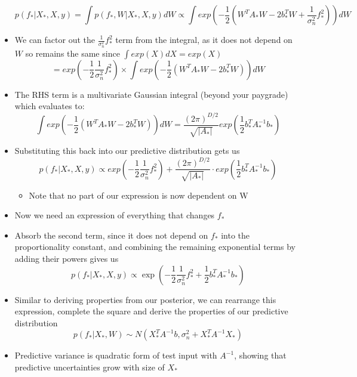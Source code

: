 \documentclass[12pt]{article}
\begin{document}
\begin{itemize}
\begin{equation}
    p(f_*|X_*,X,y) = \int p(f_*,W|X_*,X,y)dW \propto \int exp\left(-\frac{1}{2}\left(W^TA_*W - 2b_*^TW + \frac{1}{\sigma_n^2}f_*^2\right)\right)dW
\end{equation}
    \item We can factor out the $\frac{1}{\sigma_n^2}f_*^2$ term from the integral, as it does not depend on $W$ so remains the same since $\int exp(X) dX = exp(X)$ 
\begin{equation}
    = exp\left(-\frac{1}{2}\frac{1}{\sigma_n^2}f_*^2\right) \times \int exp\left(-\frac{1}{2}\left(W^TA_*W - 2b_*^TW\right)\right) dW
\end{equation}
    \item The RHS term is a multivariate Gaussian integral (beyond your paygrade) which evaluates to:
\begin{equation}
    \int exp\left(-\frac{1}{2} \left( W^TA_*W - 2b_*^TW \right) \right) dW = \frac{(2\pi)^{D/2}} {\sqrt{|A_*|}} exp\left( \frac{1}{2} b_*^TA_*^{-1}b_* \right)
\end{equation}
    \item Substituting this back into our predictive distribution gets us
\begin{equation}
    p(f_*|X_*,X,y) \propto exp\left(-\frac{1}{2}\frac{1}{\sigma_n^2}f_*^2\right) + \frac{(2\pi)^{D/2}}{\sqrt{|A_*|}} \cdot exp\left(\frac{1}{2}b_*^TA_*^{-1}b_*\right)  
\end{equation}
    \begin{itemize}
        \item Note that no part of our expression is now dependent on W
    \end{itemize}
    \item Now we need an expression of everything that changes $f_*$
    \item Absorb the second term, since it does not depend on $f_*$ into the proportionality constant, and combining the remaining exponential terms by adding their powers gives us
\begin{equation}
    p(f_*|X_*,X,y) \propto \exp\left(-\frac{1}{2}\frac{1}{\sigma_n^2}f_*^2 + \frac{1}{2}b_*^TA_*^{-1}b_*\right)
\end{equation}
    \item Similar to deriving properties from our posterior, we can rearrange this expression, complete the square and derive the properties of our predictive distribution
\begin{equation}
    p(f_*|X_*,W) \sim N(X_*^TA^{-1}b, \sigma_n^2 + X_*^TA^{-1}X_*)
\end{equation}
    \item Predictive variance is quadratic form of test input with $A^{-1}$, showing that predictive uncertainties grow with size of $X_*$

\end{itemize}
\end{document}
